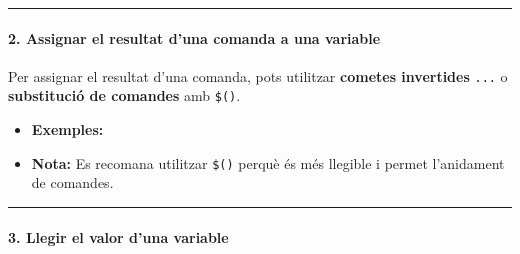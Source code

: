 \documentclass[
  12 pt,
  a4paper,
]{article}
\newenvironment{Shaded}{\begin{snugshade}}{\end{snugshade}}
\newcommand{\AttributeTok}[1]{\textcolor[rgb]{0.13,0.29,0.53}{#1}}
\newcommand{\BuiltInTok}[1]{#1}
\newcommand{\CommentTok}[1]{\textcolor[rgb]{0.56,0.35,0.01}{\textit{#1}}}
\newcommand{\ExtensionTok}[1]{#1}
\newcommand{\FunctionTok}[1]{\textcolor[rgb]{0.13,0.29,0.53}{\textbf{#1}}}
\newcommand{\KeywordTok}[1]{\textcolor[rgb]{0.13,0.29,0.53}{\textbf{#1}}}
\newcommand{\OperatorTok}[1]{\textcolor[rgb]{0.81,0.36,0.00}{\textbf{#1}}}
\newcommand{\StringTok}[1]{\textcolor[rgb]{0.31,0.60,0.02}{#1}}
\newcommand{\VariableTok}[1]{\textcolor[rgb]{0.00,0.00,0.00}{#1}}
\begin{document}
\begin{center}\rule{0.5\linewidth}{0.5pt}\end{center}

\paragraph{\texorpdfstring{\textbf{2. Assignar el resultat d'una comanda
a una
variable}}{2. Assignar el resultat d'una comanda a una variable}}\label{assignar-el-resultat-duna-comanda-a-una-variable}

Per assignar el resultat d'una comanda, pots utilitzar \textbf{cometes
invertides} \texttt{\textasciigrave{}...\textasciigrave{}} o
\textbf{substitució de comandes} amb \texttt{\$()}.

\begin{Shaded}
\end{Shaded}

\begin{itemize}
\item
  \textbf{Exemples:}

\begin{Shaded}
\end{Shaded}
\item
  \textbf{Nota:} Es recomana utilitzar \texttt{\$()} perquè és més
  llegible i permet l'anidament de comandes.
\end{itemize}

\begin{center}\rule{0.5\linewidth}{0.5pt}\end{center}

\paragraph{\texorpdfstring{\textbf{3. Llegir el valor d'una
variable}}{3. Llegir el valor d'una variable}}\label{llegir-el-valor-duna-variable}
\end{document}
